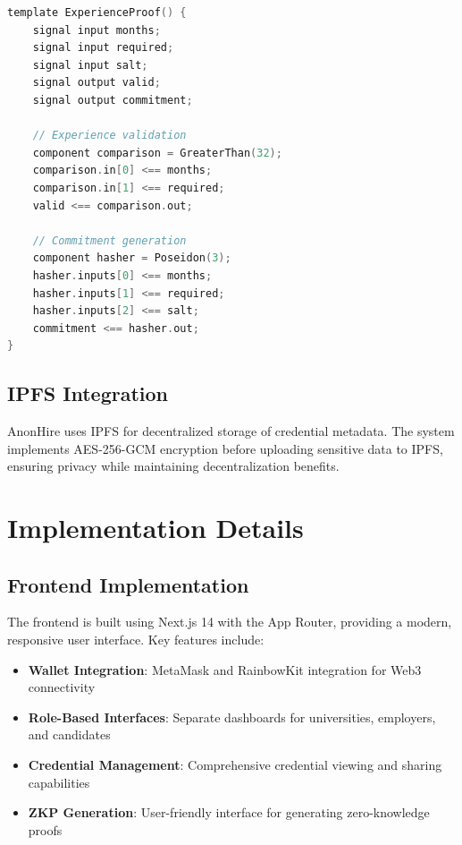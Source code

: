\documentclass[conference]{IEEEtran}
\begin{document}
\begin{lstlisting}[language=C, caption=Experience Proof Circuit]
template ExperienceProof() {
    signal input months;
    signal input required;
    signal input salt;
    signal output valid;
    signal output commitment;
    
    // Experience validation
    component comparison = GreaterThan(32);
    comparison.in[0] <== months;
    comparison.in[1] <== required;
    valid <== comparison.out;
    
    // Commitment generation
    component hasher = Poseidon(3);
    hasher.inputs[0] <== months;
    hasher.inputs[1] <== required;
    hasher.inputs[2] <== salt;
    commitment <== hasher.out;
}
\end{lstlisting}

\subsection{IPFS Integration}

AnonHire uses IPFS for decentralized storage of credential metadata. The system implements AES-256-GCM encryption before uploading sensitive data to IPFS, ensuring privacy while maintaining decentralization benefits.

\section{Implementation Details}

\subsection{Frontend Implementation}

The frontend is built using Next.js 14 with the App Router, providing a modern, responsive user interface. Key features include:

\begin{itemize}
\item \textbf{Wallet Integration}: MetaMask and RainbowKit integration for Web3 connectivity
\item \textbf{Role-Based Interfaces}: Separate dashboards for universities, employers, and candidates
\item \textbf{Credential Management}: Comprehensive credential viewing and sharing capabilities
\item \textbf{ZKP Generation}: User-friendly interface for generating zero-knowledge proofs
\end{itemize}
\end{document}
